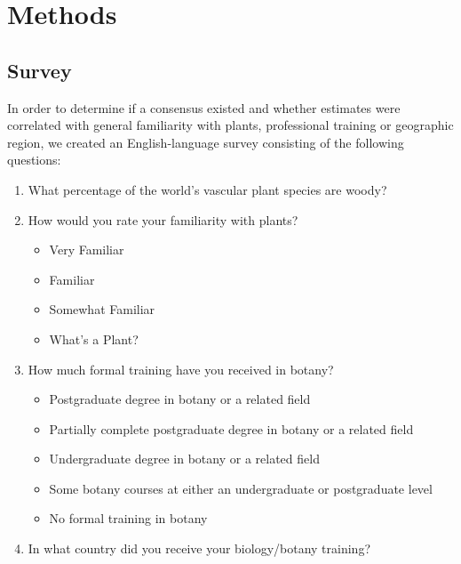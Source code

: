 \documentclass[12pt]{article}
\begin{document}
\section{Methods}
\subsection{Survey}
In order to determine if a consensus existed and whether estimates were correlated with general familiarity with plants, professional training or geographic region, we created an English-language survey consisting of the following questions:

\begin{enumerate}

\item What percentage of the world's vascular plant species are woody?

\item How would you rate your familiarity with plants?

	\begin{itemize}
	
		\item Very Familiar
	
		\item Familiar
	
		\item Somewhat Familiar
	
		\item What's a Plant?
	
	\end{itemize}
	
\item How much formal training have you received in botany?

	\begin{itemize}
	
		\item Postgraduate degree in botany or a related field
		
		\item Partially complete postgraduate degree in botany or a related field
		
		\item Undergraduate degree in botany or a related field
		
		\item Some botany courses at either an undergraduate or postgraduate level
		
		\item No formal training in botany
		
	\end{itemize}
	
\item In what country did you receive your biology/botany training?

\end{enumerate}
\end{document}
